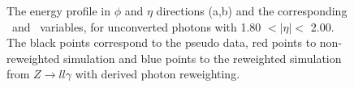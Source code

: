 \begin{figure}[htbp]
	\begin{tcolorbox}[colback=black!5!white,colframe=white!75!black]
    \caption{The energy profile in $\phi$ and $\eta$ directions (a,b) and the corresponding \Rphi \ and \Reta \ variables, for unconverted photons with 1.80 $ < |\eta| < $ 2.00. The black points correspond to the pseudo data, red points to non-reweighted simulation and blue points to the reweighted simulation from $Z\rightarrow ll\gamma$ with derived photon reweighting.}
    \label{Photon:2}
    \end{tcolorbox}
    
\end{figure}

\begin{figure}[htbp]
    \centering
	 \\

\end{figure}
